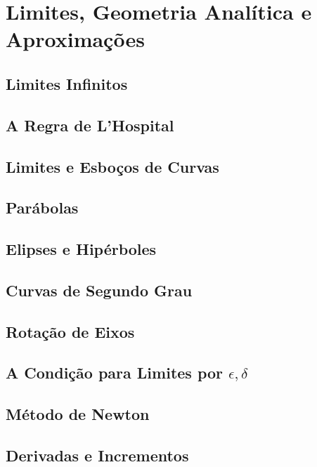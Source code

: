 \chapter{Limites, Geometria Analítica e Aproximações}
\label{chp:limits}

\section{Limites Infinitos}
\label{sec:inflimits}

\section{A Regra de L'Hospital}
\label{sec:lhospital}

\section{Limites e Esboços de Curvas}
\label{sec:limsketch}

\section{Parábolas}
\label{sec:parabolas}

\section{Elipses e Hipérboles}
\label{sec:ellipses}

\section{Curvas de Segundo Grau}
\label{sec:seconddegcurves}

\section{Rotação de Eixos}
\label{sec:rotationaxes}

\section{A Condição para Limites por $\epsilon, \delta$}
\label{sec:epsilondelta}

\section{Método de Newton}
\label{sec:newtonmethod}

\section{Derivadas e Incrementos}
\label{sec:derivsinc}

\begin{chapterproblems}
\end{chapterproblems}


